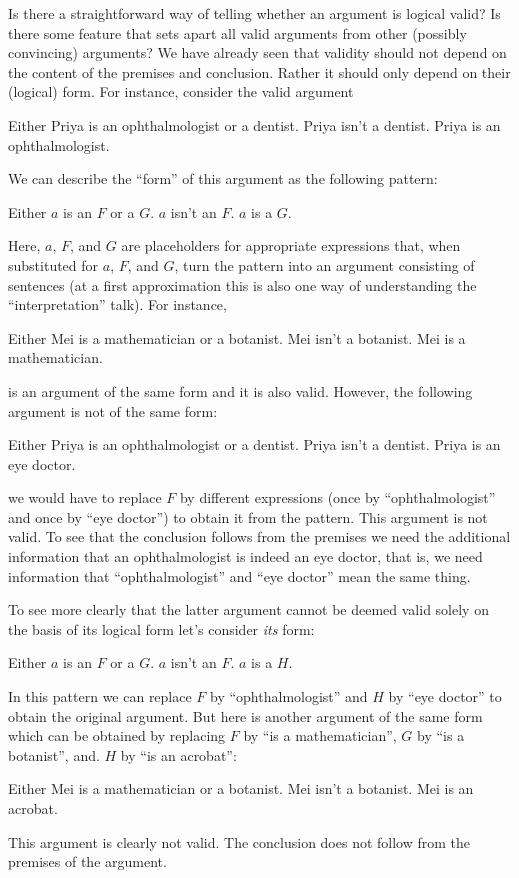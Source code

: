 Is there a straightforward way of telling whether an argument is logical valid? Is there some feature that sets apart all valid arguments from other (possibly convincing) arguments? We have already seen that validity should not depend on the content of the premises and conclusion. Rather it should only depend on their (logical) form. For instance, consider the valid argument
\begin{earg}
	\prem Either Priya is an ophthalmologist or a dentist.
	\prem Priya isn't a dentist.
	\conc Priya is an ophthalmologist.
\end{earg}
We can describe the ``form'' of this argument as the following pattern:
\begin{earg}
	\prem Either $a$ is an $F$ or a $G$.
	\prem $a$ isn't an $F$.
	\conc $a$ is a $G$.
\end{earg}
Here, $a$, $F$, and $G$ are placeholders for appropriate expressions that, when substituted for $a$, $F$, and $G$, turn the pattern into an argument consisting of sentences (at a first approximation this is also one way of understanding the ``interpretation'' talk). For instance,
\begin{earg}
	\prem Either Mei is a mathematician or a botanist.
	\prem Mei isn't a botanist.
	\conc Mei is a mathematician.
\end{earg}
is an argument of the same form and it is also valid. However, the following argument is not of the same form:
\begin{earg}
	\prem Either Priya is an ophthalmologist or a dentist.
	\prem Priya isn't a dentist.
	\conc Priya is an eye doctor.
\end{earg}
we would have to replace $F$ by different expressions (once by ``ophthalmologist'' and once by ``eye doctor'') to obtain it from the pattern. This argument is not valid. To see that the conclusion follows from the premises we need the additional information that an ophthalmologist is indeed an eye doctor, that is, we need information that ``ophthalmologist'' and ``eye doctor'' mean the same thing.

To see more clearly that the latter argument cannot be deemed valid solely on the basis of its logical form let's consider \emph{its} form:
\begin{earg}
	\prem Either $a$ is an $F$ or a $G$.
	\prem $a$ isn't an $F$.
	\conc $a$ is a $H$.
\end{earg}
In this pattern we can replace $F$ by ``ophthalmologist'' and $H$ by ``eye doctor'' to obtain the original argument.  But here is another argument of the same form which can be obtained by replacing $F$ by ``is a mathematician'', $G$ by ``is a botanist'', and. $H$ by ``is an acrobat'':
\begin{earg}
	\prem Either Mei is a mathematician or a botanist.
	\prem Mei isn't a botanist.
	\conc Mei is an acrobat.
\end{earg}
This argument is clearly not valid. The conclusion does not follow from the premises of the argument.

